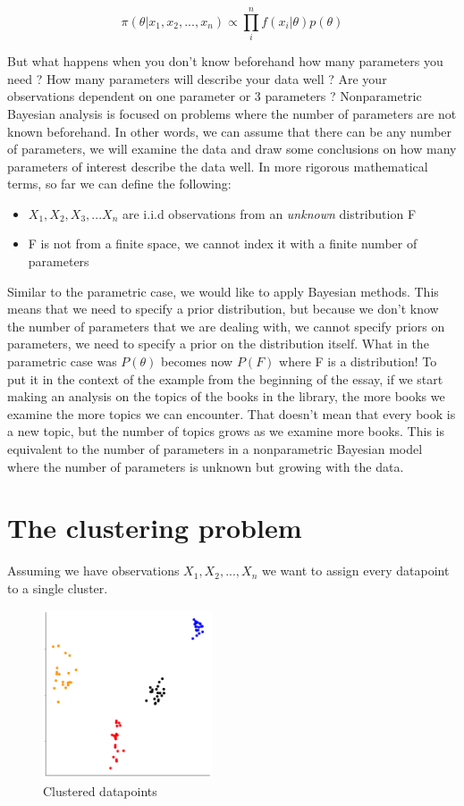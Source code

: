 \documentclass[12pt,a4paper]{article}
\begin{document}
$$\pi(\theta|x_{1}, x_{2}, ..., x_{n}) \propto \prod_{i}^{n}f(x_{i}|\theta)p(\theta)$$ 

But what happens when you don't know beforehand how many parameters you need ? How many parameters will describe
your data well ? Are your observations dependent on one parameter or 3 parameters ? Nonparametric Bayesian analysis
is focused on problems where the number of parameters are not known beforehand. In other words, we can assume that
there can be any number of parameters, we will examine the data and draw some conclusions on how many parameters of 
interest describe the data well. 
In more rigorous mathematical terms, so far we can define the following:

\begin{itemize}
    \item $X_{1}, X_{2}, X_{3}, ... X_{n}$ are i.i.d observations from an \textit{unknown} distribution F
    \item F is not from a finite space, we cannot index it with a finite number of parameters
\end{itemize}

Similar to the parametric case, we would like to apply Bayesian methods. This means that we need to 
specify a prior distribution, but because we don't know the number of parameters that we are dealing with,
we cannot specify priors on parameters, we need to specify a prior on the distribution itself. What in 
the parametric case was $P(\theta)$ becomes now $P(F)$ where F is a distribution! 
To put it in the context of the example from the beginning of the essay, if we start making an analysis on
the topics of the books in the library, the more books we examine the more topics we can encounter. That doesn't
mean that every book is a new topic, but the number of topics grows as we examine more books. This is equivalent
to the number of parameters in a nonparametric Bayesian model where the number of parameters is unknown but growing
with the data. 

\section{The clustering problem}
Assuming we have observations $X_{1}, X_{2}, ..., X_{n}$ we want to assign every datapoint to a single cluster.

\begin{figure} [H]
    \begin{center}
        \includegraphics[scale=0.3, width=5cm]{clusters.png}
        \caption{Clustered datapoints}
        \label{fig:boat1}
    \end{center}
\end{figure}
\end{document}
